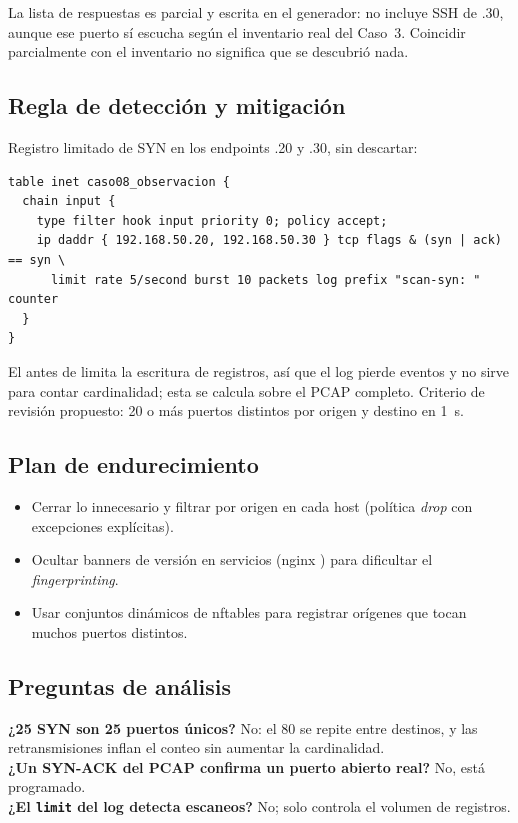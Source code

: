 La lista de respuestas es parcial y escrita en el generador: no incluye SSH de .30, aunque ese puerto sí escucha según el inventario real del Caso~3. Coincidir parcialmente con el inventario no significa que se descubrió nada.

\subsection{Regla de detección y mitigación}
Registro limitado de SYN en los endpoints .20 y .30, sin descartar:
\begin{lstlisting}
table inet caso08_observacion {
  chain input {
    type filter hook input priority 0; policy accept;
    ip daddr { 192.168.50.20, 192.168.50.30 } tcp flags & (syn | ack) == syn \
      limit rate 5/second burst 10 packets log prefix "scan-syn: " counter
  }
}
\end{lstlisting}
El  antes de  limita la escritura de registros, así que el log pierde eventos y no sirve para contar cardinalidad; esta se calcula sobre el PCAP completo. Criterio de revisión propuesto: 20 o más puertos distintos por origen y destino en 1~s.

\subsection{Plan de endurecimiento}
\begin{itemize}
\item Cerrar lo innecesario y filtrar por origen en cada host (política \emph{drop} con excepciones explícitas).
\item Ocultar banners de versión en servicios (nginx \cod{server\_tokens off}) para dificultar el \emph{fingerprinting}.
\item Usar conjuntos dinámicos de nftables para registrar orígenes que tocan muchos puertos distintos.
\end{itemize}

\subsection{Preguntas de análisis}
\textbf{¿25 SYN son 25 puertos únicos?} No: el 80 se repite entre destinos, y las retransmisiones inflan el conteo sin aumentar la cardinalidad.\\
\textbf{¿Un SYN-ACK del PCAP confirma un puerto abierto real?} No, está programado.\\
\textbf{¿El \texttt{limit} del log detecta escaneos?} No; solo controla el volumen de registros.

